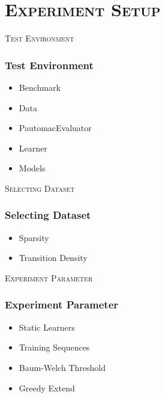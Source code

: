 \section{\scshape Experiment Setup}

\begin{frame}
\center \huge \scshape Test Environment
\end{frame}

\begin{frame}
  \frametitle{Test Environment}
  \begin{itemize}
		\item Benchmark
		\item Data
	  	\item PautomacEvaluator
	  	\item Learner
	  	\item Models
  \end{itemize}
\end{frame}

\begin{frame}
	\center \huge \scshape Selecting Dataset
\end{frame}

\begin{frame}
	\frametitle{Selecting Dataset}
	\begin{itemize}
		\item Sparsity
		\item Transition Density
	\end{itemize}
\end{frame}

\begin{frame}
	\center \huge \scshape Experiment Parameter
\end{frame}

\begin{frame}
	\frametitle{Experiment Parameter}
	\begin{itemize}
		\item Static Learners
		\item Training Sequences
		\item Baum-Welch Threshold
		\item Greedy Extend
	\end{itemize}
\end{frame}